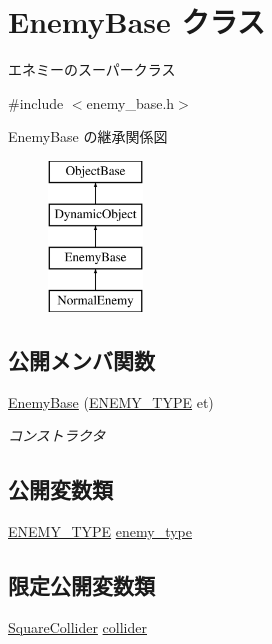 \hypertarget{class_enemy_base}{}\section{Enemy\+Base クラス}
\label{class_enemy_base}


エネミーのスーパークラス  




{\ttfamily \#include $<$enemy\+\_\+base.\+h$>$}

Enemy\+Base の継承関係図\begin{figure}[H]
\begin{center}
\leavevmode
\includegraphics[height=4.000000cm]{class_enemy_base}
\end{center}
\end{figure}
\subsection*{公開メンバ関数}
\begin{DoxyCompactItemize}
\item 
\mbox{\hyperlink{class_enemy_base_abe56e3aa221224c1196fd65f897d5f19}{Enemy\+Base}} (\mbox{\hyperlink{enemy__base_8h_aef73e23ea1cdc9dda520bbb81af707db}{E\+N\+E\+M\+Y\+\_\+\+T\+Y\+PE}} et)
\begin{DoxyCompactList}\small\item\em コンストラクタ \end{DoxyCompactList}\end{DoxyCompactItemize}
\subsection*{公開変数類}
\begin{DoxyCompactItemize}
\item 
\mbox{\hyperlink{enemy__base_8h_aef73e23ea1cdc9dda520bbb81af707db}{E\+N\+E\+M\+Y\+\_\+\+T\+Y\+PE}} \mbox{\hyperlink{class_enemy_base_a34ad22e6b0d06b8d63c207c843383eba}{enemy\+\_\+type}}
\end{DoxyCompactItemize}
\subsection*{限定公開変数類}
\begin{DoxyCompactItemize}
\item 
\mbox{\hyperlink{class_square_collider}{Square\+Collider}} \mbox{\hyperlink{class_enemy_base_aea91f1e50b8977daa467a3d9fe5f0ef9}{collider}}
\end{DoxyCompactItemize}
